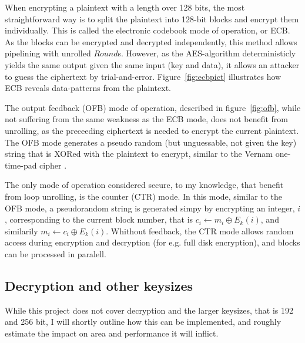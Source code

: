 When encrypting a plaintext with a length over 128 bits, the most
straightforward way is to split the plaintext into 128-bit blocks and
encrypt them individually. This is called the electronic codebook mode
of operation, or ECB. As the blocks can be encrypted and decrypted
independently, this method allows pipelining with unrolled
$Round$s. However, as the AES-algorithm deterministicly yields the
same output given the same input (key and data), it allows an attacker
to guess the ciphertext by trial-and-error. Figure~\ref{fig:ecbpict}
illustrates how ECB reveals data-patterns from the plaintext.

The output feedback (OFB) mode of operation, described in
figure~\ref{fig:ofb}, while not suffering from the same weakness as
the ECB mode, does not benefit from unrolling, as the preceeding
ciphertext is needed to encrypt the current plaintext. The OFB mode
generates a pseudo random (but unguessable, not given the key) string
that is XORed with the plaintext to encrypt, similar to the Vernam
one-time-pad cipher \cite{vernam}.

The only mode of operation considered secure, to my knowledge, that
benefit from loop unrolling, is the counter (CTR) mode. In this mode,
similar to the OFB mode, a pseudorandom string is generated simpy by
encrypting an integer, $i$, corresponding to the current block number, that
is $c_i \leftarrow m_i \oplus E_k(i)$, and similarily $m_i \leftarrow
c_i \oplus E_k(i)$. Whithout feedback, the CTR mode allows random
access during encryption and decryption (for e.g. full disk
encryption), and blocks can be processed in paralell.

\subsection{Decryption and other keysizes}

While this project does not cover decryption and the larger keysizes,
that is 192 and 256 bit, I will shortly outline how this can be
implemented, and roughly estimate the impact on area and performance
it will inflict.


